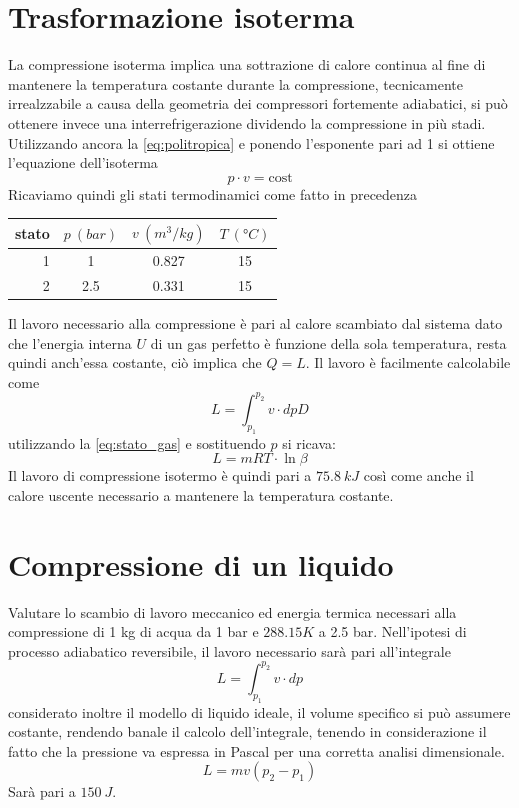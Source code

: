 \documentclass[a4paper,12pt]{article}
\begin{document}
\section{Trasformazione isoterma}
\label{sec:quarta_trasformazione}
La compressione isoterma implica una sottrazione di calore continua al fine di mantenere la temperatura
costante durante la compressione, tecnicamente irrealzzabile a causa della geometria dei compressori
fortemente adiabatici, si può ottenere invece una interrefrigerazione dividendo la compressione in più 
stadi.
Utilizzando ancora la \eqref{eq:politropica} e ponendo l'esponente pari ad 1 si ottiene l'equazione dell'isoterma
\begin{equation}
    p\cdot v = \text{cost}
\end{equation}
Ricaviamo quindi gli stati termodinamici come fatto in precedenza
\begin{center}
    \begin{tabular}{r|c|c|c}
        stato    & $p\ (bar)$ & $v\ (m^3/kg)$ & $T\ (\text{°}C) $\\ \hline
        1   &           1 &          0.827    &           15     \\ \hline
        2   &         2.5 &          0.331    &           15
    \end{tabular}
\end{center}
Il lavoro necessario alla compressione è pari al calore scambiato dal sistema dato che l'energia interna $U$
di un gas perfetto è funzione della sola temperatura, resta quindi anch'essa costante, ciò implica che
$Q = L$.
Il lavoro è facilmente calcolabile come 
\begin{equation}
    L = \int_{p_1}^{p_2} v\cdot dpD
\end{equation}
utilizzando la \eqref{eq:stato_gas} e sostituendo $p$ si ricava:
\begin{equation}
    L = mRT\cdot \ln\beta
\end{equation}
Il lavoro di compressione isotermo è quindi pari a $75.8\ kJ$ così come anche il calore uscente necessario a 
mantenere la temperatura costante.

\section{Compressione di un liquido}
\label{sec:compressione_liquido}
Valutare lo scambio di lavoro meccanico ed energia termica necessari alla compressione di 1 kg di acqua da
1 bar e $288.15 K$ a 2.5 bar.
Nell'ipotesi di processo adiabatico reversibile, il lavoro necessario sarà pari all'integrale 
\begin{equation}
    L = \int_{p_1}^{p_2} v\cdot dp
\end{equation}
considerato inoltre il modello di liquido ideale, il volume specifico si può assumere costante, rendendo banale
il calcolo dell'integrale, tenendo in considerazione il fatto che la pressione va espressa in Pascal
per una corretta analisi dimensionale.
\begin{equation}
    L = mv(p_2-p_1)
\end{equation}
Sarà pari a $150\ J$.
\end{document}
